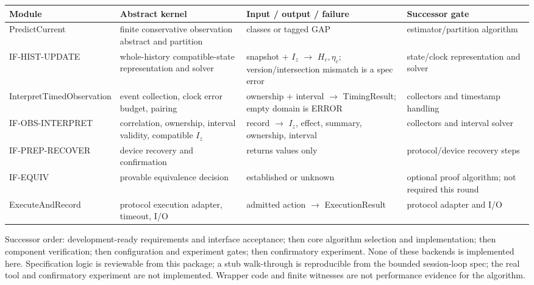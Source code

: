 \begin{table}[H]
\centering
\small
\begin{tabular}{@{}p{4.4cm}p{3.9cm}p{3.6cm}p{3.4cm}@{}}
\hline
Module & Abstract kernel & Input / output / failure & Successor gate \\
\hline
PredictCurrent & finite conservative observation abstract and partition & classes or tagged GAP & estimator/partition algorithm \\
IF-HIST-UPDATE & whole-history compatible-state representation and solver & snapshot + $I_z$ $\to$ $H_c,\eta_c$; version/intersection mismatch is a spec error & state/clock representation and solver \\
InterpretTimedObservation & event collection, clock error budget, pairing & ownership + interval $\to$ TimingResult; empty domain is ERROR & collectors and timestamp handling \\
IF-OBS-INTERPRET & correlation, ownership, interval validity, compatible $I_z$ & record $\to$ $I_z$, effect, summary, ownership, interval & collectors and interval solver \\
IF-PREP-RECOVER & device recovery and confirmation & returns values only & protocol/device recovery steps \\
IF-EQUIV & provable equivalence decision & established or unknown & optional proof algorithm; not required this round \\
ExecuteAndRecord & protocol execution adapter, timeout, I/O & admitted action $\to$ ExecutionResult & protocol adapter and I/O \\
\hline
\end{tabular}
\end{table}

{\sloppy Successor order: development-ready requirements and interface
acceptance; then core algorithm selection and implementation; then component
verification; then configuration and experiment gates; then confirmatory
experiment.} None of these
backends is implemented here. Specification logic is reviewable from this
package; a stub walk-through is reproducible from the bounded session-loop spec;
the real tool and confirmatory experiment are not implemented. Wrapper code and
finite witnesses are not performance evidence for the algorithm.
